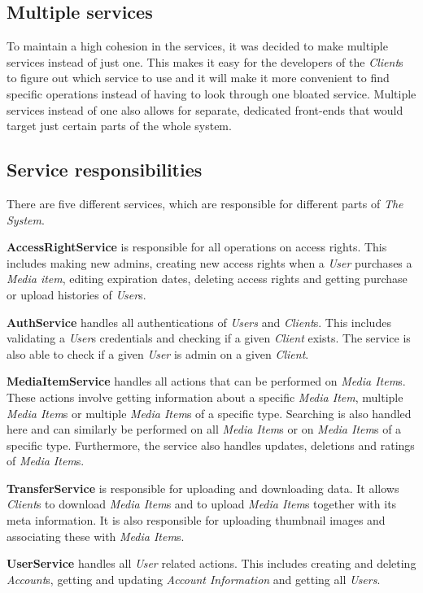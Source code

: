 \documentclass[../report.tex]{subfiles}
\begin{document}
\subsection{Multiple services}
To maintain a high cohesion in the services, it was decided to make multiple services instead of just one. This makes it easy for the developers of the \textit{Client}s to figure out which service to use and it will make it more convenient to find specific operations instead of having to look through one bloated service. Multiple services instead of one also allows for separate, dedicated front-ends that would target just certain parts of the whole system. 

\subsection{Service responsibilities}
There are five different services, which are responsible for different parts of \textit{The System}. 

\textbf{AccessRightService} is responsible for all operations on access rights. This includes making new admins, creating new access rights when a \textit{User} purchases a \textit{Media item}, editing expiration dates, deleting access rights and getting purchase or upload histories of \textit{User}s. 

\textbf{AuthService} handles all authentications of \textit{Users} and \textit{Client}s.
This includes validating a \textit{User}s credentials and checking if a given \textit{Client} exists.
The service is also able to check if a given \textit{User} is admin on a given \textit{Client}.

\textbf{MediaItemService} handles all actions that can be performed on \textit{Media Item}s. These actions involve getting information about a specific \textit{Media Item}, multiple \textit{Media Item}s or multiple \textit{Media Item}s of a specific type. Searching is also handled here and can similarly be performed on all \textit{Media Item}s or on \textit{Media Item}s of a specific type. Furthermore, the service also handles updates, deletions and ratings of \textit{Media Item}s.

\textbf{TransferService} is responsible for uploading and downloading data. It allows \textit{Client}s to download \textit{Media Item}s and to upload \textit{Media Item}s together with its meta information. It is also responsible for uploading thumbnail images and associating these with \textit{Media Item}s.

\textbf{UserService} handles all \textit{User} related actions. This includes creating and deleting \textit{Account}s, getting and updating \textit{Account Information} and getting all \textit{Users}. 
\end{document}
